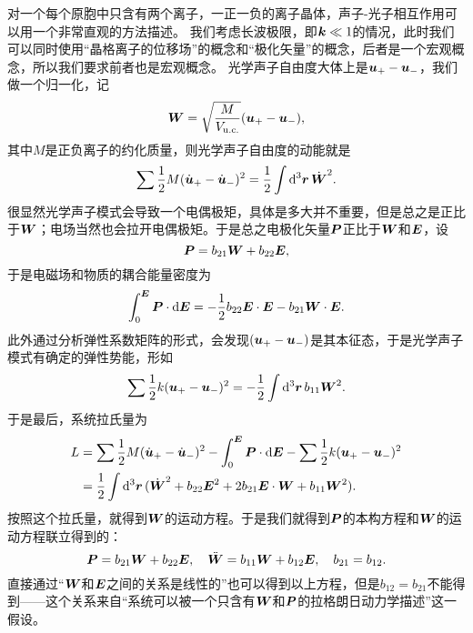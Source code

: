 对一个每个原胞中只含有两个离子，一正一负的离子晶体，声子-光子相互作用可以用一个非常直观的方法描述。
我们考虑长波极限，即$\vb*{k} \ll 1$的情况，此时我们可以同时使用“晶格离子的位移场”的概念和“极化矢量”的概念，后者是一个宏观概念，所以我们要求前者也是宏观概念。
光学声子自由度大体上是$\vb*{u}_+ - \vb*{u}_-$，我们做一个归一化，记
\begin{equation}
    \vb*{W} = \sqrt{\frac{M}{V_\text{u.c.}}} (\vb*{u}_+ - \vb*{u}_-),
\end{equation}
其中$M$是正负离子的约化质量，则光学声子自由度的动能就是
\[
    \sum \frac{1}{2} M (\dot{\vb*{u}}_+ - \dot{\vb*{u}}_-)^2 = \frac{1}{2} \int \dd[3]{\vb*{r}} \dot{\vb*{W}}^2.
\]
很显然光学声子模式会导致一个电偶极矩，具体是多大并不重要，但是总之是正比于$\vb*{W}$；电场当然也会拉开电偶极矩。于是总之电极化矢量$\vb*{P}$正比于$\vb*{W}$和$\vb*{E}$，设
\begin{equation}
    \vb*{P} = b_{21} \vb*{W} + b_{22} \vb*{E},
\end{equation}
于是电磁场和物质的耦合能量密度为
\[
    \int_0^{\vb*{E}} \vb*{P} \cdot \dd{\vb*{E}} = - \frac{1}{2} b_{22} \vb*{E} \cdot \vb*{E} - b_{21} \vb*{W} \cdot \vb*{E}. 
\]
此外通过分析弹性系数矩阵的形式，会发现$(\vb*{u}_+ - \vb*{u}_-)$是其本征态，于是光学声子模式有确定的弹性势能，形如
\[
    \sum \frac{1}{2} k (\vb*{u}_+ - \vb*{u}_-)^2 = - \frac{1}{2} \int \dd[3]{\vb*{r}} b_{11} \vb*{W}^2.
\]
于是最后，系统拉氏量为
\begin{equation}
    \begin{aligned}
        L &= \sum \frac{1}{2} M (\dot{\vb*{u}}_+ - \dot{\vb*{u}}_-)^2 - \int_0^{\vb*{E}} \vb*{P} \cdot \dd{\vb*{E}} - \sum \frac{1}{2} k (\vb*{u}_+ - \vb*{u}_-)^2 \\
        &= \frac{1}{2} \int \dd[3]{\vb*{r}} (\dot{\vb*{W}}^2 + b_{22} \vb*{E}^2 + 2 b_{21} \vb*{E} \cdot \vb*{W} + b_{11} \vb*{W}^2).
    \end{aligned}
\end{equation}
按照这个拉氏量，就得到$\vb*{W}$的运动方程。于是我们就得到$\vb*{P}$的本构方程和$\vb*{W}$的运动方程联立得到的：
\begin{equation}
    \vb*{P} = b_{21} \vb*{W} + b_{22} \vb*{E}, \quad \ddot{\vb*{W}} = b_{11} \vb*{W} + b_{12} \vb*{E}, \quad b_{21} = b_{12}.
    \label{eq:huang-eq}
\end{equation}
直接通过“$\vb*{W}$和$\vb*{E}$之间的关系是线性的”也可以得到以上方程，但是$b_{12} = b_{21}$不能得到——这个关系来自“系统可以被一个只含有$\vb*{W}$和$\vb*{P}$的拉格朗日动力学描述”这一假设。

